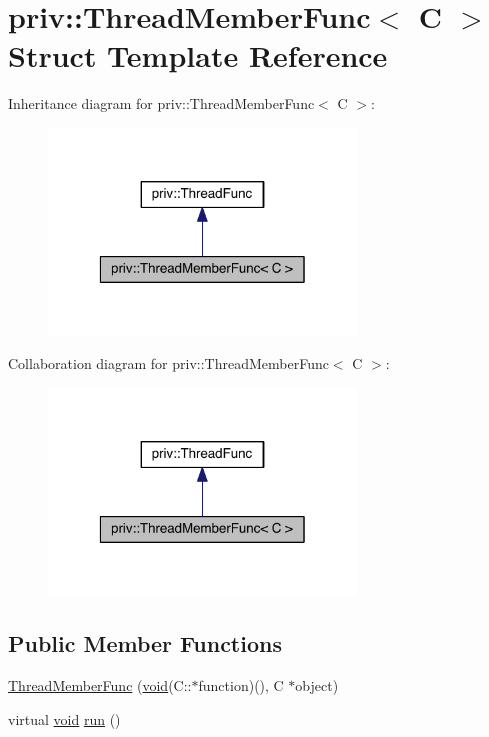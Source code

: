\hypertarget{structpriv_1_1_thread_member_func}{\section{priv\-:\-:Thread\-Member\-Func$<$ C $>$ Struct Template Reference}
\label{structpriv_1_1_thread_member_func}
}


Inheritance diagram for priv\-:\-:Thread\-Member\-Func$<$ C $>$\-:
\nopagebreak
\begin{figure}[H]
\begin{center}
\leavevmode
\includegraphics[width=232pt]{structpriv_1_1_thread_member_func__inherit__graph}
\end{center}
\end{figure}


Collaboration diagram for priv\-:\-:Thread\-Member\-Func$<$ C $>$\-:
\nopagebreak
\begin{figure}[H]
\begin{center}
\leavevmode
\includegraphics[width=232pt]{structpriv_1_1_thread_member_func__coll__graph}
\end{center}
\end{figure}
\subsection*{Public Member Functions}
\begin{DoxyCompactItemize}
\item 
\hyperlink{structpriv_1_1_thread_member_func_ae44619c4cf6d886da6f32a1de37d652e}{Thread\-Member\-Func} (\hyperlink{glutf90_8h_ac778d6f63f1aaf8ebda0ce6ac821b56e}{void}(C\-::$\ast$function)(), C $\ast$object)
\item 
virtual \hyperlink{glutf90_8h_ac778d6f63f1aaf8ebda0ce6ac821b56e}{void} \hyperlink{structpriv_1_1_thread_member_func_abbd440e93edf2747cf9cdde579bc5de0}{run} ()
\end{DoxyCompactItemize}
